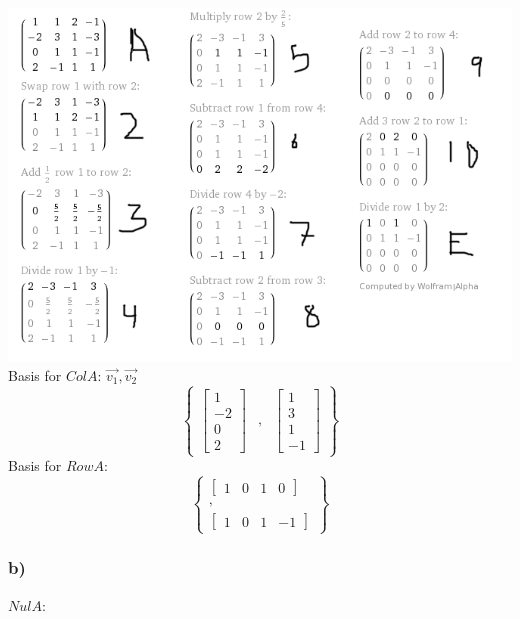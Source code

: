 \documentclass[12pt,norsk,a4paper]{article}
\begin{document}
\includegraphics[scale=0.4]{row-reduce.png}\\
Basis for $Col A$: {$\vec{v_1}, \vec{v_2}$}\\
\begin{equation*}
\begin{Bmatrix}
\begin{bmatrix}
1\\
-2\\
0\\
2
\end{bmatrix} & , &
\begin{bmatrix}
1\\
3\\
1\\
-1
\end{bmatrix}
\end{Bmatrix}
\end{equation*}
Basis for $Row A$:
\begin{equation*}
\begin{Bmatrix}
\begin{bmatrix}
1 & 0 & 1 & 0
\end{bmatrix}\\
,\\
\begin{bmatrix}
1 & 0 & 1 & -1
\end{bmatrix}
\end{Bmatrix}
\end{equation*}
\clearpage
\subsubsection{b)} %
\label{ssub:b_}
$Nul A$:
\end{document}
